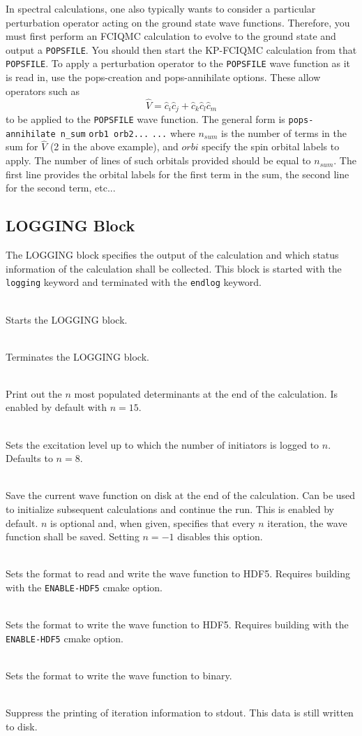 \documentclass[a4paper,notitlepage]{scrreprt}
\newcommand\codeitem[1]{\needspace{1.5\baselineskip}\item[\textnormal{\ttfamily #1 \nopagebreak}] \hfill \\ \nopagebreak}
\let\code\lstinline
\begin{document}
    In spectral calculations, one also typically wants to consider a particular
    perturbation operator acting on the ground state wave functions. Therefore,
    you must first perform an FCIQMC calculation to evolve to the ground state
    and output a \code{POPSFILE}. You should then start the KP-FCIQMC
    calculation from that \code{POPSFILE}. To apply a perturbation operator to
    the \code{POPSFILE} wave function as it is read in, use the pops-creation
    and pops-annihilate options. These allow operators such as
    \begin{equation}
        \hat{V} = \hat{c}_i \hat{c}_j + \hat{c}_k \hat{c}_l \hat{c}_m
    \end{equation}
    to be applied to the \code{POPSFILE} wave function. The general form is
    \code{pops-annihilate n_sum}
    \code{orb1 orb2...}
    \code{...}
    where $n_{sum}$ is the number of terms in the sum for $\hat{V}$ (2 in the
    above example), and $orbi$ specify the spin orbital labels to apply. The
    number of lines of such orbitals provided should be equal to $n_{sum}$. The
    first line provides the orbital labels for the first term in the sum, the
    second line for the second term, etc...

    \subsection{LOGGING Block}
    The LOGGING block specifies the output of the calculation and which
    status information of the calculation shall be collected. This block is
    started with the \texttt{logging} keyword and terminated with the
    \texttt{endlog} keyword.
    \begin{description}
      \codeitem{logging}
      Starts the LOGGING block.
      \codeitem{endlog}
      Terminates the LOGGING block.      
      \codeitem{highlypopwrite $n$}
      Print out the $n$ most populated determinants at the end of the
      calculation. Is enabled by default with $n=15$.
      \codeitem{inits-exlvl-write $n$}
      Sets the excitation level up to which the number of initiators is logged
      to $n$. Defaults to $n=8$.
      \codeitem{popsfile $n$}
      Save the current wave function on disk at the end of the
      calculation. Can be used to initialize subsequent calculations and
      continue the run. This is enabled by default. $n$ is optional and, when
      given, specifies that every $n$ iteration, the wave function shall be
      saved. Setting $n=-1$ disables this option.
      \codeitem{hdf5-popsfile}
      Sets the format to read and write the wave function to HDF5. Requires building
      with the \texttt{ENABLE-HDF5} cmake option.
      \codeitem{hdf5-pops-write}
      Sets the format to write the wave function to HDF5. Requires building
      with the \texttt{ENABLE-HDF5} cmake option.
      \codeitem{binarypops}
      Sets the format to write the wave function to binary.
      \codeitem{nomcoutput}
      Suppress the printing of iteration information to stdout. This data is
      still written to disk.
    \end{description}
\end{document}
